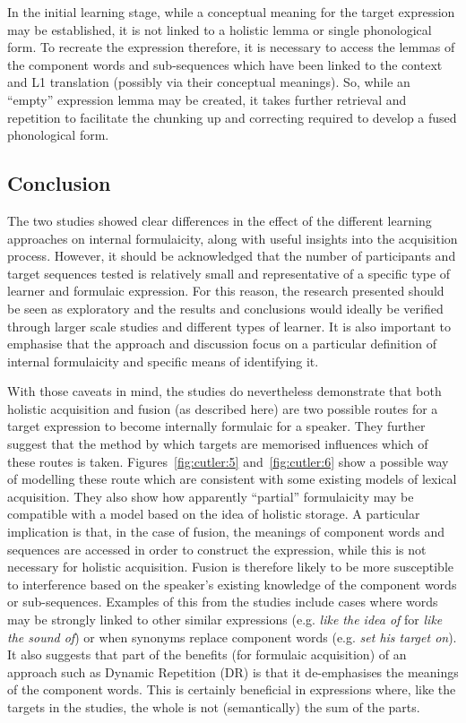 \documentclass[output=paper]{langscibook}
\begin{document}
In the initial learning stage, while a conceptual meaning for the target expression may be established, it is not linked to a holistic lemma or single phonological form. To recreate the expression therefore, it is necessary to access the lemmas of the component words and sub-sequences which have been linked to the context and L1 translation (possibly via their conceptual meanings).  So, while an ``empty'' expression lemma may be created, it takes further retrieval and repetition to facilitate the chunking up and correcting required to develop a fused phonological form. 

\subsection{Conclusion}

The two studies showed clear differences in the effect of the different learning approaches on internal formulaicity, along with useful insights into the acquisition process. However, it should be acknowledged that the number of participants and target sequences tested is relatively small and representative of a specific type of learner and formulaic expression. For this reason, the research presented should be seen as exploratory and the results and conclusions would ideally be verified through larger scale studies and different types of learner. It is also important to emphasise that the approach and discussion focus on a particular definition of internal formulaicity and specific means of identifying it.

With those caveats in mind, the studies do nevertheless demonstrate that both holistic acquisition and fusion (as described here) are two possible routes for a target expression to become internally formulaic for a speaker. They further suggest that the method by which targets are memorised influences which of these routes is taken. Figures~\ref{fig:cutler:5} and~\ref{fig:cutler:6} show a possible way of modelling these route which are consistent with some existing models of lexical acquisition. They also show how apparently ``partial'' formulaicity may be compatible with a model based on the idea of holistic storage. A particular implication is that, in the case of fusion, the meanings of component words and sequences are accessed in order to construct the expression, while this is not necessary for holistic acquisition. Fusion is therefore likely to be more susceptible to interference based on the speaker’s existing knowledge of the component words or sub-sequences. Examples of this from the studies include cases where words may be strongly linked to other similar expressions (e.g. \textit{like the idea of} for \textit{like the sound of}) or when synonyms replace component words (e.g. \textit{set his target on}). It also suggests that part of the benefits (for formulaic acquisition) of an approach such as Dynamic Repetition (DR) is that it de-emphasises the meanings of the component words. This is certainly beneficial in expressions where, like the targets in the studies, the whole is not (semantically) the sum of the parts. 
\end{document}
